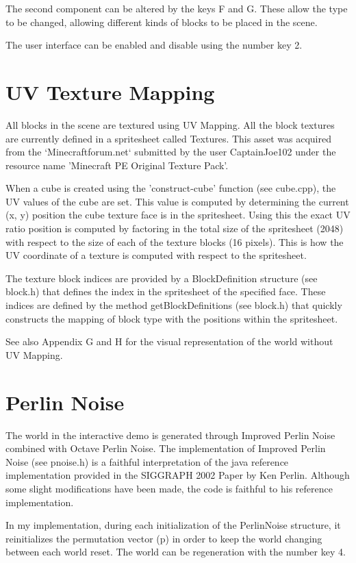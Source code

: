 \documentclass{book}
\begin{document}
The second component can be altered by the keys F and G.  These allow the type to be changed, allowing different kinds of blocks to be placed in the scene.
    
The user interface can be enabled and disable using the number key 2. 
    
\section{UV Texture Mapping}
All blocks in the scene are textured using UV Mapping.  All the block textures are currently defined in a spritesheet called Textures.  This asset was acquired from the `Minecraftforum.net`
submitted by the user CaptainJoe102 under the resource name 'Minecraft PE Original Texture Pack'.
    
When a cube is created using the 'construct-cube' function (see cube.cpp), the UV values of the cube are set.  This value is computed by determining the current (x, y) position the cube texture face is in the spritesheet.  Using this the exact UV ratio position is computed by factoring in the total size of the spritesheet (2048) with respect to the size of each of the texture blocks (16 pixels).  This is how the UV coordinate of a texture is computed with respect to the spritesheet.
    
The texture block indices are provided by a BlockDefinition structure (see block.h) that defines the index in the spritesheet of the specified face.  These indices are defined by the method getBlockDefinitions (see block.h) that quickly constructs the mapping of block type with the positions within the spritesheet.
    
See also Appendix G and H for the visual representation of the world without UV Mapping.
    
\section{Perlin Noise}
The world in the interactive demo is generated through Improved Perlin Noise combined with Octave Perlin Noise.  The implementation of Improved Perlin Noise (see pnoise.h) is a faithful interpretation of the java reference implementation provided in the SIGGRAPH 2002 Paper by Ken Perlin.  Although some slight modifications have been made, the code is faithful to his reference implementation.
    
In my implementation, during each initialization of the PerlinNoise structure, it reinitializes the permutation vector (p) in order to keep the world changing between each world reset.  The world can be regeneration with the number key 4.
    
\end{document}

